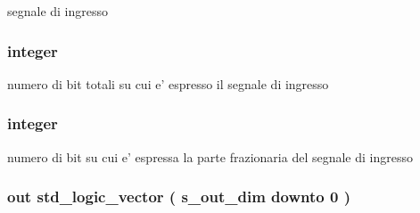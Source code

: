 segnale di ingresso 

\hypertarget{group___truncation_gad3d18243ad6fe53a2277e2aa9b94ca45}{
\subsubsection[{s\+\_\+in\+\_\+dim}]{ {\bfseries \textcolor{vhdlchar}{ }} {\bfseries \textcolor{vhdlchar}{integer}\textcolor{vhdlchar}{ }} \hspace{0.3cm}{\ttfamily [Generic]}}}\label{group___truncation_gad3d18243ad6fe53a2277e2aa9b94ca45}


numero di bit totali su cui e' espresso il segnale di ingresso 

\hypertarget{group___truncation_gabe72b503b8140ab0d84911165e959b53}{
\subsubsection[{s\+\_\+in\+\_\+int}]{ {\bfseries \textcolor{vhdlchar}{ }} {\bfseries \textcolor{vhdlchar}{integer}\textcolor{vhdlchar}{ }} \hspace{0.3cm}{\ttfamily [Generic]}}}\label{group___truncation_gabe72b503b8140ab0d84911165e959b53}


numero di bit su cui e' espressa la parte frazionaria del segnale di ingresso 

\hypertarget{group___truncation_ga7c0b5e84820296cfa624ce710d19debd}{
\subsubsection[{s\+\_\+out}]{ {\bfseries \textcolor{vhdlchar}{out}\textcolor{vhdlchar}{ }} {\bfseries \textcolor{vhdlchar}{std\+\_\+logic\+\_\+vector}\textcolor{vhdlchar}{ }\textcolor{vhdlchar}{(}\textcolor{vhdlchar}{ }\textcolor{vhdlchar}{ }\textcolor{vhdlchar}{ }\textcolor{vhdlchar}{ }{\bfseries {\bf s\+\_\+out\+\_\+dim}} \textcolor{vhdlchar}{ }\textcolor{vhdlchar}{downto}\textcolor{vhdlchar}{ }\textcolor{vhdlchar}{ } \textcolor{vhdldigit}{0} \textcolor{vhdlchar}{ }\textcolor{vhdlchar}{)}\textcolor{vhdlchar}{ }} \hspace{0.3cm}{\ttfamily [Port]}}}\label{group___truncation_ga7c0b5e84820296cfa624ce710d19debd}


